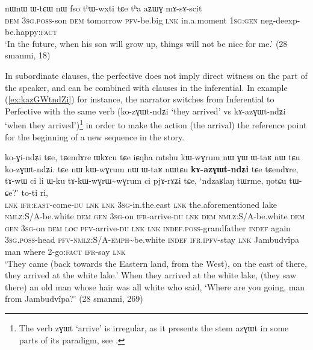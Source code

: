 \documentclass[oldfontcommands,oneside,a4paper,11pt]{article}
\newcommand{\ipa}[1]{{\phon \mbox{#1}}} %
\newcommand{\refb}[1]{(\ref{#1})}
\newcommand{\factual}[1]{\textsc{:fact}}
\newcommand{\rdp}{\textasciitilde{}}
\begin{document}
\begin{exe}
\ex \label{ex:thWwxti}
\gll 
\ipa{nɯnɯ} 	\ipa{ɯ-tɕɯ} 	\ipa{nɯ} 	\ipa{fso} 	\ipa{tʰɯ-wxti} 	\ipa{tɕe} 	\ipa{tʰa} 	\ipa{aʑɯɣ} 	\ipa{mɤ-sɤ-scit}  \\
\textsc{dem} \textsc{3sg.poss}-son \textsc{dem} tomorrow \textsc{pfv}-be.big \textsc{lnk} in.a.moment \textsc{1sg:gen} neg-deexp-be.happy\factual{} \\
\glt `In the future, when his son will grow up, things will not be nice for me.' (28 smanmi, 18)
\end{exe}

In subordinate clauses, the perfective does not imply direct witness on the part of the speaker, and can be combined with clauses in the inferential. In example \refb{ex:kazGWtndZi} for instance, the narrator switches from Inferential to Perfective with the same verb (\ipa{ko-zɣɯt-ndʑi} `they arrived' vs \ipa{kɤ-azɣɯt-ndʑi} `when they arrived')\footnote{The verb \ipa{zɣɯt} `arrive' is irregular, as it presents the stem \ipa{azɣɯt} in some parts of its paradigm, see \citet[424]{jacques04these}. } in order to make the action (the arrival) the reference point for the beginning of a new sequence in the story.

\begin{exe}
\ex \label{ex:kazGWtndZi}
\gll \ipa{tɕendɤre} 	\ipa{ko-ɣi-ndʑi} 	\ipa{tɕe,} 	\ipa{tɕendɤre} 	\ipa{ɯkɤcu} 	\ipa{tɕe} 	\ipa{iɕqha} 	\ipa{mtshu} 	\ipa{kɯ-wɣrum} 	\ipa{nɯ} 	\ipa{ɣɯ} 	\ipa{ɯ-taʁ} 	\ipa{nɯ} \ipa{tɕu} 	\ipa{ko-zɣɯt-ndʑi.} \ipa{tɕe} 	\ipa{nɯ} 	\ipa{kɯ-wɣrum} 	\ipa{nɯ} 	\ipa{ɯ-taʁ} 	\ipa{nɯtɕu} 	\textbf{\ipa{kɤ-azɣɯt-ndʑi}} 	\ipa{tɕe} 	\ipa{tɕendɤre,} 
\ipa{tɤ-wɯ} 	\ipa{ci} 	\ipa{li} 	\ipa{ɯ-ku} 	\ipa{tɤ-kɯ-wɣrɯ\rdp{}wɣrum} 	\ipa{ci} 	\ipa{pjɤ-rɤʑi} \ipa{tɕe,} \ipa{`ndzaʁlaŋ} 	\ipa{tɯrme,} 	\ipa{ŋotɕu} 	\ipa{tɯ-ɕe?'} 	\ipa{to-ti} 	\ipa{ri,} \\
\textsc{lnk} \textsc{ifr:east}-come-\textsc{du} \textsc{lnk}  \textsc{lnk} \textsc{3sg}-in.the.east  \textsc{lnk} the.aforementioned lake \textsc{nmlz}:S/A-be.white \textsc{dem} \textsc{gen} \textsc{3sg}-on \textsc{ifr}-arrive-\textsc{du} \textsc{lnk} \textsc{dem} \textsc{nmlz}:S/A-be.white \textsc{dem} \textsc{gen} \textsc{3sg}-on \textsc{dem} \textsc{loc} \textsc{pfv}-arrive-\textsc{du}  \textsc{lnk}  \textsc{lnk} \textsc{indef.poss}-grandfather \textsc{indef} again \textsc{3sg.poss}-head \textsc{pfv}-\textsc{nmlz}:S/A-\textsc{emph}\rdp{}be.white  \textsc{indef} \textsc{ifr.ipfv}-stay   \textsc{lnk} Jambudvîpa man where 2-go\factual{} \textsc{ifr}-say \textsc{lnk} \\
\glt `They came (back towards the Eastern land, from the West), on the east of there, they arrived at the white lake.' When they arrived at the white lake, (they saw there) an old man whose hair was all white who said, `Where are you going, man from Jambudvîpa?' (28 smanmi, 269)
\end{exe}
\end{document}
